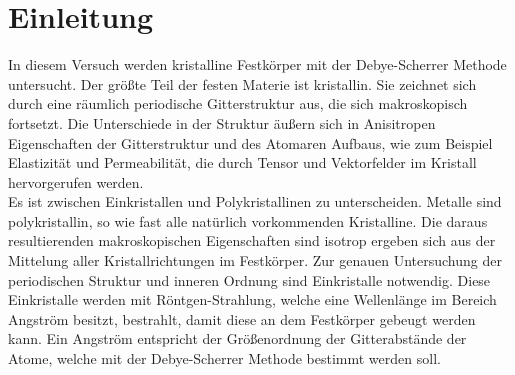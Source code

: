 \section{Einleitung}
\label{sec:Einleitung}
In diesem Versuch werden kristalline Festkörper mit der Debye-Scherrer Methode untersucht. 
Der größte Teil der festen Materie ist kristallin. 
Sie zeichnet sich durch eine räumlich periodische Gitterstruktur aus, die sich makroskopisch fortsetzt. 
Die Unterschiede in der Struktur äußern sich in Anisitropen Eigenschaften der Gitterstruktur  und des Atomaren Aufbaus, wie zum Beispiel Elastizität und Permeabilität, die durch Tensor und Vektorfelder im Kristall hervorgerufen werden.\\
Es ist zwischen Einkristallen und Polykristallinen zu unterscheiden. 
Metalle sind polykristallin, so wie fast alle natürlich vorkommenden Kristalline.
Die daraus resultierenden makroskopischen Eigenschaften sind isotrop ergeben sich aus der Mittelung aller Kristallrichtungen im Festkörper.
Zur genauen Untersuchung der periodischen Struktur und inneren Ordnung sind Einkristalle notwendig.  
Diese Einkristalle werden mit Röntgen-Strahlung, welche eine Wellenlänge im Bereich Angström besitzt, bestrahlt, damit diese an dem Festkörper gebeugt werden kann.
Ein Angström entspricht der Größenordnung der Gitterabstände der Atome, welche mit der Debye-Scherrer Methode bestimmt werden soll.	